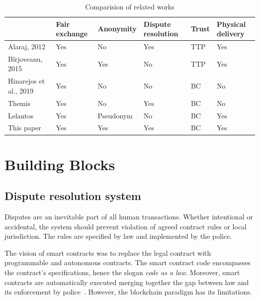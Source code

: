 \begin{table}
\newcommand{\YES}{\cellcolor{green!50}Yes}
\newcommand{\ID}{\cellcolor{green!25}Identity}
\newcommand{\PSEUDO}{\cellcolor{green!25}Pseudonym}
\newcommand{\ANON}{\cellcolor{green!50}Anonymity}
\newcommand{\NO}{\cellcolor{red!50}No}
\newcommand{\TTP}{\cellcolor{red!50}TTP}
\newcommand{\BC}{\cellcolor{green!50}BC}
\caption{Comparision of related works}
\label{tab:comparision}
\setlength{\tabcolsep}{3pt}

\ifx\JOURNAL\JOURNALIEEE
\begin{tabular}{|p{40pt}|p{35pt}|p{40pt}|p{35pt}|p{30pt}|p{30pt}|}
\else
\begin{tabular}{|c|c|c|c|c|c|}
\fi
\hline
Protocol & Fair exchange & Anonymity & Dispute resolution & Trust & Physical delivery \\
\hline
Alaraj, 2012~\cite{mohammedalarajFairnessPhysicalProducts2012} & \YES & \NO & \YES & \TTP & \YES \\
\hline
Bîrjoveanu, 2015~\cite{birjoveanuAnonymityFairexchangeEcommerce2015} & \YES & \YES & \NO & \TTP & \YES \\
\hline
Hinarejos et al., 2019~\cite{hinarejosSolutionSecureCertified2019} & \YES & \NO & \NO & \BC & \NO \\
\hline
Themis~\cite{mengThemisDecentralizedEscrow2019} & \YES & \NO & \YES & \BC & \NO \\
\hline
Lelantos~\cite{altawyLelantosBlockchainBasedAnonymous2017} & \YES & \PSEUDO & \NO & \BC & \YES \\
\hline
This paper & \YES & \YES & \YES & \BC & \YES \\
\hline

\end{tabular}
\end{table}
 
\section{Building Blocks}\label{sec:building-blocks}
\subsection{Dispute resolution system}

Disputes are an inevitable part of all human transactions. Whether intentional or accidental, the system should prevent violation of agreed contract rules or local jurisdiction. The rules are specified by law and implemented by the police.

The vision of smart contracts was to replace the legal contract with
programmable and autonomous contracts. The smart contract code encompasses the contract's specifications, hence the slogan \textit{code as a law}. Moreover, smart contracts are automatically executed merging together the gap between law and its enforcement by police~\cite{allenGovernanceBlockchainDispute2019}. However, the blockchain paradigm has its limitations. 
 
